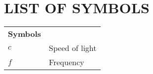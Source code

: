 \chapter{LIST OF SYMBOLS}

\par\noindent
\vspace{2cm}
\begin{tabular}{@{}p{30mm}l@{}}
\textbf{Symbols}    & \\
$c$                 & Speed of light\\
$f$                 & Frequency\\
\end{tabular}
